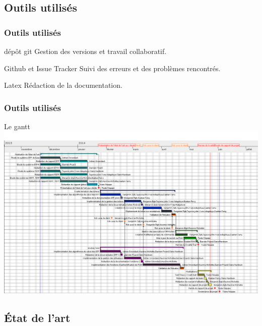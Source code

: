 \documentclass[xcolor=table]{beamer}
\begin{document}
\subsection{Outils utilisés}
\begin{frame}
\frametitle{Outils utilisés}

\begin{block}{dépôt git}
Gestion des versions et travail collaboratif.
\end{block}

\begin{block}{Github et Issue Tracker}
Suivi des erreurs et des problèmes rencontrés.
\end{block}

\begin{block}{Latex}
Rédaction de la documentation.
\end{block}

\end{frame}

\begin{frame}
\frametitle{Outils utilisés}
\begin{block}{Le gantt}
\includegraphics[scale=0.21]{../graphics/gantt2-0.png}
\end{block}
\end{frame}

\subsection{État de l'art}
\end{document}
